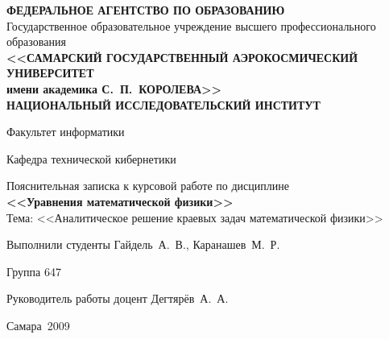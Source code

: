 \begin{titlepage}
\newpage

\begin{center}
\scriptsize
\textbf{ФЕДЕРАЛЬНОЕ АГЕНТСТВО ПО ОБРАЗОВАНИЮ}\\
Государственное образовательное учреждение высшего профессионального образования\\
\textbf{<<САМАРСКИЙ ГОСУДАРСТВЕННЫЙ АЭРОКОСМИЧЕСКИЙ УНИВЕРСИТЕТ}\\
\textbf{имени академика С.~П.~КОРОЛЕВА>>}\\
\textbf{НАЦИОНАЛЬНЫЙ ИССЛЕДОВАТЕЛЬСКИЙ ИНСТИТУТ}
\normalsize

\vfill

Факультет информатики

Кафедра технической кибернетики

\vfill
\normalsize
Пояснительная записка к курсовой работе по дисциплине\\ \textbf{<<Уравнения математической физики>>}\\
\Large
Тема: <<Аналитическое решение краевых задач математической физики>>
\end{center}

\vfill

Выполнили студенты Гайдель~А.~В., Каранашев~М.~Р.

Группа 647

Руководитель работы доцент Дегтярёв~А.~А.


\vfill

\begin{center}
Самара~2009
\end{center}
\end{titlepage}